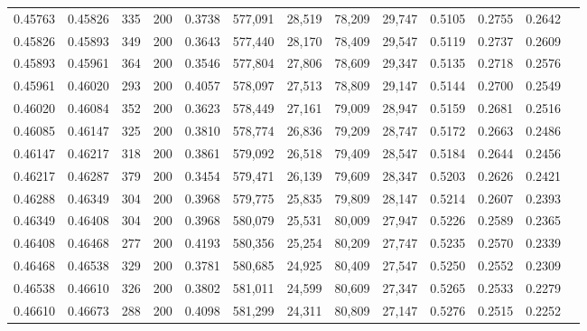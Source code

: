 \begin{tabular}{rrrrrrrrrrrrr}
0.45763 & 0.45826 &    335 & 200 &                                     0.3738 & 577,091 &  28,519 &  78,209 &  29,747 & 0.5105 & 0.2755 & 0.2642 \\
0.45826 & 0.45893 &    349 & 200 &                                     0.3643 & 577,440 &  28,170 &  78,409 &  29,547 & 0.5119 & 0.2737 & 0.2609 \\
0.45893 & 0.45961 &    364 & 200 &                                     0.3546 & 577,804 &  27,806 &  78,609 &  29,347 & 0.5135 & 0.2718 & 0.2576 \\
0.45961 & 0.46020 &    293 & 200 &                                     0.4057 & 578,097 &  27,513 &  78,809 &  29,147 & 0.5144 & 0.2700 & 0.2549 \\
0.46020 & 0.46084 &    352 & 200 &                                     0.3623 & 578,449 &  27,161 &  79,009 &  28,947 & 0.5159 & 0.2681 & 0.2516 \\
0.46085 & 0.46147 &    325 & 200 &                                     0.3810 & 578,774 &  26,836 &  79,209 &  28,747 & 0.5172 & 0.2663 & 0.2486 \\
0.46147 & 0.46217 &    318 & 200 &                                     0.3861 & 579,092 &  26,518 &  79,409 &  28,547 & 0.5184 & 0.2644 & 0.2456 \\
0.46217 & 0.46287 &    379 & 200 &                                     0.3454 & 579,471 &  26,139 &  79,609 &  28,347 & 0.5203 & 0.2626 & 0.2421 \\
0.46288 & 0.46349 &    304 & 200 &                                     0.3968 & 579,775 &  25,835 &  79,809 &  28,147 & 0.5214 & 0.2607 & 0.2393 \\
0.46349 & 0.46408 &    304 & 200 &                                     0.3968 & 580,079 &  25,531 &  80,009 &  27,947 & 0.5226 & 0.2589 & 0.2365 \\
0.46408 & 0.46468 &    277 & 200 &                                     0.4193 & 580,356 &  25,254 &  80,209 &  27,747 & 0.5235 & 0.2570 & 0.2339 \\
0.46468 & 0.46538 &    329 & 200 &                                     0.3781 & 580,685 &  24,925 &  80,409 &  27,547 & 0.5250 & 0.2552 & 0.2309 \\
0.46538 & 0.46610 &    326 & 200 &                                     0.3802 & 581,011 &  24,599 &  80,609 &  27,347 & 0.5265 & 0.2533 & 0.2279 \\
0.46610 & 0.46673 &    288 & 200 &                                     0.4098 & 581,299 &  24,311 &  80,809 &  27,147 & 0.5276 & 0.2515 & 0.2252 \\

\end{tabular}
